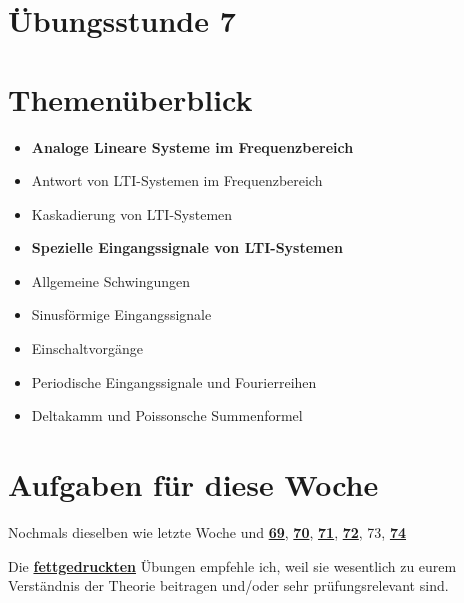 \documentclass[11pt]{article}
\begin{document}
\thispagestyle{firstpage}

\setlength{\headheight}{1 \baselineskip}  %
\setlength{\parindent}{0pt}  %
\setlength{\parskip}{\baselineskip}  %

\vspace*{-5px}
\section*{Übungsstunde 7}

\section*{Themenüberblick}
\begin{itemize}
    \item \textbf{Analoge Lineare Systeme im Frequenzbereich}
    \item[] Antwort von LTI-Systemen im Frequenzbereich
    \item[] Kaskadierung von LTI-Systemen
    \item \textbf{Spezielle Eingangssignale von LTI-Systemen}
    \item[] Allgemeine Schwingungen
    \item[] Sinusförmige Eingangssignale 
    \item[] Einschaltvorgänge
    \item[] Periodische Eingangssignale und Fourierreihen
    \item[] Deltakamm und Poissonsche Summenformel
\end{itemize}

\section*{Aufgaben für diese Woche}
\vspace{-0.5cm}

Nochmals dieselben wie letzte Woche und \underline{\textbf{69}}, \underline{\textbf{70}}, \underline{\textbf{71}}, \underline{\textbf{72}}, 73, \underline{\textbf{74}}\\
\vspace{-0.5cm}

Die \underline{\textbf{fettgedruckten}} Übungen empfehle ich, weil sie wesentlich zu eurem Verständnis der Theorie beitragen und/oder sehr prüfungsrelevant sind.

\vfill \null
\pagebreak
\end{document}
